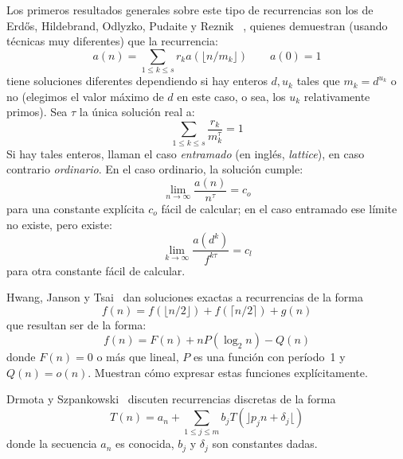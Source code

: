   Los primeros resultados generales sobre este tipo de recurrencias
  son los de Erdős, Hildebrand, Odlyzko, Pudaite y Reznik~%
    \cite{erdos87:_asymptotic_behavior_family_sequences},
  quienes demuestran
  (usando técnicas muy diferentes)
  que la recurrencia:
  \begin{equation*}
    a(n)
      = \sum_{1 \le k \le s} r_k a(\lfloor n / m_k \rfloor)
      \qquad a(0) = 1
  \end{equation*}
  tiene soluciones diferentes dependiendo si hay enteros \(d, u_k\)
  tales que \(m_k = d^{u_k}\) o no
  (elegimos el valor máximo de \(d\) en este caso,
   o sea,
   los \(u_k\) relativamente primos).
  Sea \(\tau\) la única solución real a:
  \begin{equation*}
    \sum_{1 \le k \le s} \frac{r_k}{m_k^\tau}
      = 1
  \end{equation*}
  Si hay tales enteros,
  llaman el caso \emph{entramado}
  (en inglés, \emph{\foreignlanguage{english}{lattice}}),
  en caso contrario \emph{ordinario}.
  En el caso ordinario,
  la solución cumple:
  \begin{equation*}
    \lim_{n \to \infty} \frac{a(n)}{n^\tau}
      = c_o
  \end{equation*}
  para una constante explícita \(c_o\) fácil de calcular;
  en el caso entramado ese límite no existe,
  pero existe:
  \begin{equation*}
    \lim_{k \to \infty} \frac{a(d^k)}{f^{k \tau}}
      = c_l
  \end{equation*}
  para otra constante fácil de calcular.

  Hwang, Janson y Tsai~%
    \cite{hwang17:_exact_asymp_solut_divid_conquer}
  dan soluciones exactas a recurrencias de la forma
  \begin{equation*}
    f(n)
      = f(\lfloor n / 2 \rfloor) + f(\lceil n / 2 \rceil) + g(n)
  \end{equation*}
  que resultan ser de la forma:
  \begin{equation*}
    f(n)
      = F(n) + n P( \log_2 n) - Q(n)
  \end{equation*}
  donde \(F(n) = 0\) o más que lineal,
  \(P\) es una función con período~\num{1}
  y \(Q(n) = o(n)\).
  Muestran cómo expresar estas funciones explícitamente.

  Drmota y Szpankowski~%
    \cite{drmota13:_master_theorem_discrete}
  discuten recurrencias discretas de la forma
  \begin{equation*}
    T(n)
      = a_n + \sum_{1 \le j \le m} b_j T(\rfloor p_j n + \delta_j \lfloor)
  \end{equation*}
  donde la secuencia \(a_n\) es conocida,
  \(b_j\) y \(\delta_j\) son constantes dadas.




